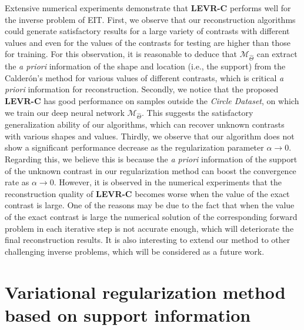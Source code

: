 \documentclass[11pt]{article}
\newcommand{\Calderon}{Calder\'{o}n}
\begin{document}
Extensive numerical experiments demonstrate that \textbf{LEVR-C} performs well for the inverse problem of EIT. 
First, we observe that our reconstruction algorithms could generate satisfactory results for a large variety of contrasts with different values and even for the values of the contrasts for testing are higher than those for training. 
For this observation, it is reasonable to deduce that $ \mathcal{M}_{\widehat{\Theta}} $ can extract the \textit{a priori} information of the shape and location (i.e., the support) from the \Calderon's method for various values of different contrasts, which is critical \textit{a priori} information for reconstruction.
Secondly, we notice that the proposed \textbf{LEVR-C} has good performance on samples outside the \textit{Circle Dataset}, on which we train our deep neural network $ \mathcal{M}_{\widehat{\Theta}} $. 
This suggests the satisfactory generalization ability of our algorithms, which can recover unknown contrasts with various shapes and values.
Thirdly, we observe that our algorithm does not show a significant performance decrease as the regularization parameter $\alpha\to 0$.
Regarding this, we believe this is because the \textit{a priori} information of the support of the unknown contrast in our regularization method can boost the convergence rate as $\alpha\to 0$.
However, it is observed in the numerical experiments that the reconstruction quality of \textbf{LEVR-C} becomes worse when the value of the exact contrast is large. 
One of the reasons may be due to the fact that when the value of the exact contrast is large the numerical solution of the corresponding forward problem in each iterative step is not accurate enough, which will deteriorate the final reconstruction results. 
It is also interesting to extend our method to other challenging inverse problems, which will be considered as a future work.


\appendix
\section{Variational regularization method based on support information}\label{A}
\end{document}
